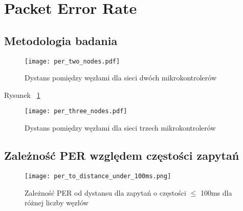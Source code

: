 \section{Packet Error Rate}

\subsection{Metodologia badania}

\begin{figure}[!htb]
	\centering \texttt{[image: per\_two\_nodes.pdf]} 
	\caption{Dystans pomiędzy węzłami dla sieci dwóch mikrokontrolerów}
	\label{rys:two_nodes_setup}
\end{figure}

Rysunek ~\ref{rys:two_nodes_setup}

\begin{figure}[!htb]
	\centering \texttt{[image: per\_three\_nodes.pdf]} 
	\caption{Dystans pomiędzy węzłami dla sieci trzech mikrokontrolerów}
	\label{rys:three_nodes_setup}
\end{figure}

\subsection{Zależność PER względem częstości zapytań}

\begin{figure}[!htb]
	\centering \texttt{[image: per\_to\_distance\_under\_100ms.png]}
	\caption{Zależność PER od dystansu dla zapytań o częstości $\leqslant$ 100ms dla różnej liczby węzłów}
	\label{rys:per_to_distance_under_100ms}
\end{figure}

